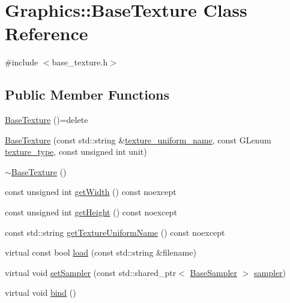 \hypertarget{class_graphics_1_1_base_texture}{}\section{Graphics\+:\+:Base\+Texture Class Reference}
\label{class_graphics_1_1_base_texture}


{\ttfamily \#include $<$base\+\_\+texture.\+h$>$}

\subsection*{Public Member Functions}
\begin{DoxyCompactItemize}
\item 
\hyperlink{class_graphics_1_1_base_texture_ae44fed159354650aee7f3e6f5d0b6477}{Base\+Texture} ()=delete
\item 
\hyperlink{class_graphics_1_1_base_texture_a7c9782999136f0101fcf5d0f6b13f006}{Base\+Texture} (const std\+::string \&\hyperlink{class_graphics_1_1_base_texture_a00bca25b10d3fe76e3f415606d302074}{texture\+\_\+uniform\+\_\+name}, const G\+Lenum \hyperlink{class_graphics_1_1_base_texture_a8541c8b38644380478955b823792b4d6}{texture\+\_\+type}, const unsigned int unit)
\item 
\hyperlink{class_graphics_1_1_base_texture_ac155c802b27ab8bbfc7dc9d2bb80dbd1}{$\sim$\+Base\+Texture} ()
\item 
const unsigned int \hyperlink{class_graphics_1_1_base_texture_aefa56cd236ec814799cc2b8c7d5a3508}{get\+Width} () const noexcept
\item 
const unsigned int \hyperlink{class_graphics_1_1_base_texture_a97d805fa4028b5864ca7a74fdb2fa915}{get\+Height} () const noexcept
\item 
const std\+::string \hyperlink{class_graphics_1_1_base_texture_ae01476d4da0efbdeffb264c5a0096d7d}{get\+Texture\+Uniform\+Name} () const noexcept
\item 
virtual const bool \hyperlink{class_graphics_1_1_base_texture_a32681ccc99ff4a4704172f9d365ea282}{load} (const std\+::string \&filename)
\item 
virtual void \hyperlink{class_graphics_1_1_base_texture_a564efe01e99f97729602ad1974d1ed38}{set\+Sampler} (const std\+::shared\+\_\+ptr$<$ \hyperlink{class_graphics_1_1_base_sampler}{Base\+Sampler} $>$ \hyperlink{class_graphics_1_1_base_texture_a7232ffaf919587d39516dcbd3f2659bd}{sampler})
\item 
virtual void \hyperlink{class_graphics_1_1_base_texture_a10e4a4b5eda51f85018bd64322e55532}{bind} ()

\end{DoxyCompactItemize}
